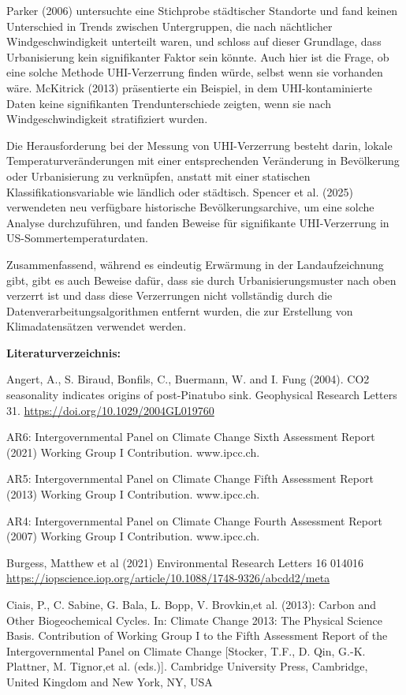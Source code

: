 \documentclass[12pt,paper=a4,DIV=12,parskip=never,chapterprefix=false,headings=standardclasses]{scrreprt}
\begin{document}
Parker (2006) untersuchte eine Stichprobe städtischer Standorte und fand keinen Unterschied in Trends zwischen Untergruppen, die nach nächtlicher Windgeschwindigkeit unterteilt waren, und schloss auf dieser Grundlage, dass Urbanisierung kein signifikanter Faktor sein könnte. Auch hier ist die Frage, ob eine solche Methode UHI-Verzerrung finden würde, selbst wenn sie vorhanden wäre. McKitrick (2013) präsentierte ein Beispiel, in dem UHI-kontaminierte Daten keine signifikanten Trendunterschiede zeigten, wenn sie nach Windgeschwindigkeit stratifiziert wurden.

Die Herausforderung bei der Messung von UHI-Verzerrung besteht darin, lokale Temperaturveränderungen mit einer entsprechenden Veränderung in Bevölkerung oder Urbanisierung zu verknüpfen, anstatt mit einer statischen Klassifikationsvariable wie ländlich oder städtisch. Spencer et al. (2025) verwendeten neu verfügbare historische Bevölkerungsarchive, um eine solche Analyse durchzuführen, und fanden Beweise für signifikante UHI-Verzerrung in US-Sommertemperaturdaten.

Zusammenfassend, während es eindeutig Erwärmung in der Landaufzeichnung gibt, gibt es auch Beweise dafür, dass sie durch Urbanisierungsmuster nach oben verzerrt ist und dass diese Verzerrungen nicht vollständig durch die Datenverarbeitungsalgorithmen entfernt wurden, die zur Erstellung von Klimadatensätzen verwendet werden.

\vfill
\noindent\textbf{Literaturverzeichnis:}

\begingroup
\parindent=0pt
\everypar{\hangindent=2em\hangafter=1\relax}

Angert, A., S. Biraud, Bonfils, C., Buermann, W. and I. Fung (2004). CO2 seasonality indicates origins of
post-Pinatubo sink. Geophysical Research Letters 31. \url{https://doi.org/10.1029/2004GL019760}

AR6: Intergovernmental Panel on Climate Change Sixth Assessment Report (2021) Working Group I
Contribution. www.ipcc.ch.

AR5: Intergovernmental Panel on Climate Change Fifth Assessment Report (2013) Working Group I
Contribution. www.ipcc.ch.

AR4: Intergovernmental Panel on Climate Change Fourth Assessment Report (2007) Working Group I
Contribution. www.ipcc.ch.

Burgess, Matthew et al (2021) Environmental Research Letters 16 014016
\url{https://iopscience.iop.org/article/10.1088/1748-9326/abcdd2/meta}

Ciais, P., C. Sabine, G. Bala, L. Bopp, V. Brovkin,et al. (2013): Carbon and Other Biogeochemical Cycles.
In: Climate Change 2013: The Physical Science Basis. Contribution of Working Group I to the Fifth
Assessment Report of the Intergovernmental Panel on Climate Change [Stocker, T.F., D. Qin, G.-K.
Plattner, M. Tignor,et al. (eds.)]. Cambridge University Press, Cambridge, United Kingdom and New
York, NY, USA
\end{document}
